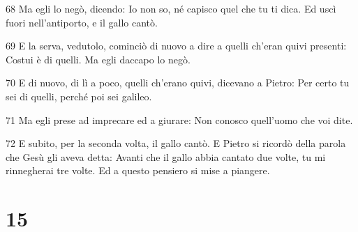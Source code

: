 \par 68 Ma egli lo negò, dicendo: Io non so, né capisco quel che tu ti dica. Ed uscì fuori nell'antiporto, e il gallo cantò.
\par 69 E la serva, vedutolo, cominciò di nuovo a dire a quelli ch'eran quivi presenti: Costui è di quelli. Ma egli daccapo lo negò.
\par 70 E di nuovo, di lì a poco, quelli ch'erano quivi, dicevano a Pietro: Per certo tu sei di quelli, perché poi sei galileo.
\par 71 Ma egli prese ad imprecare ed a giurare: Non conosco quell'uomo che voi dite.
\par 72 E subito, per la seconda volta, il gallo cantò. E Pietro si ricordò della parola che Gesù gli aveva detta: Avanti che il gallo abbia cantato due volte, tu mi rinnegherai tre volte. Ed a questo pensiero si mise a piangere.

\chapter{15}

